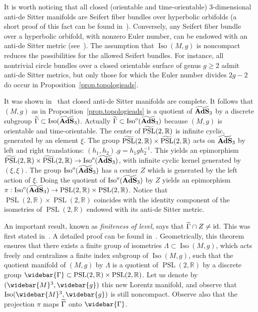 \documentclass[11pt]{article}
\theoremstyle{definition}
\numberwithin{equation}{section}
\numberwithin{figure}{section}
\numberwithin{table}{section}
\DeclareMathOperator{\Iso}{Iso}
\DeclareMathOperator{\PSL}{PSL}
\DeclareMathOperator{\id}{id}
\newcommand*\RR{\mathbb{R}}
\let\oldtilde\tilde
\renewcommand*\tilde[1]{\mathchoice{\widetilde{#1}}{\widetilde{#1}}{\widetilde{#1}}{\oldtilde{#1}}}
\let\oldbar\bar
\renewcommand*{\bar}[1]{\mathchoice{\widebar{#1}}{\widebar{#1}}{\oldbar{#1}}{\oldbar{#1}}}
\renewcommand*{\overline}{\bar}
\begin{document}
It is worth noticing that all closed (orientable and time-orientable) $3$-dimensional anti-de Sitter manifolds are Seifert fiber bundles over hyperbolic orbifolds (a short proof of this fact can be found in~\cite[Corollary~4.3.6]{tholozan}). Conversely, any Seifert fiber bundle over a hyperbolic orbifold, with nonzero Euler number, can be endowed with an anti-de Sitter metric (see~\cite{scott}). The assumption that $\Iso(M,g)$ is noncompact reduces the possibilities for the allowed Seifert bundles. For instance, all nontrivial circle bundles over a closed orientable surface of genus $g \geq 2$ admit anti-de Sitter metrics, but only those for which the Euler number divides $2g-2$ do occur in Proposition~\ref{prop.topologieads}.

It was shown in~\cite{klingler} that closed anti-de Sitter manifolds are complete. It follows that $(M,g)$ as in Proposition~\ref{prop.topologieads} is a quotient of $\tilde{\bf AdS}_3$ by a discrete subgroup $\tilde{\Gamma} \subset \Iso(\tilde{\bf AdS}_3)$. Actually $\tilde{\Gamma} \subset \Iso^o(\tilde{\bf AdS}_3)$ because $(M,g)$ is orientable and time-orientable. The center of $\tilde{\PSL}(2,\RR)$ is infinite cyclic, generated by an element $\xi$. The group $\tilde{\PSL}(2,\RR) \times
\tilde{\PSL}(2,\RR)$ acts on ${\tilde{\bf AdS}_3}$ by left and right translations: $(h_1,h_2).g=h_1gh_2^{-1}$. This yields an epimorphism $\tilde{\PSL}(2,\RR) \times
\tilde{\PSL}(2,\RR) \to \Iso^o({\tilde{\bf AdS}_3})$, with infinite cyclic kernel generated by $(\xi,\xi)$. The group $\Iso^o({\tilde{\bf AdS}_3})$ has a center $Z$ which is generated by the left action of $\xi$. Doing the quotient of $\Iso^o({\tilde{\bf AdS}_3})$ by $Z$ yields an epimorphism $\pi: \Iso^o({\tilde{\bf AdS}_3}) \to \PSL(2,\RR) \times \PSL(2,\RR)$. Notice that $\PSL(2,\RR) \times \PSL(2,\RR)$ coincides with the identity component of the isometries of $\PSL(2,\RR)$ endowed with its anti-de Sitter metric.


An important result, known as \emph{finiteness of level}, says that $\tilde{\Gamma} \cap Z \not = \id$. This was first stated in~\cite{kulkarni.raymond}. A detailed proof can be found in~\cite[Theorem~3.3.2.3]{saleinthese}. Geometrically, this theorem ensures that there exists a finite group of isometries $\Lambda \subset \Iso(M,g)$, which acts freely and centralizes a finite index subgroup of $\Iso(M,g)$, such that the quotient manifold of $(M,g)$ by $\Lambda$ is a quotient of $\PSL(2,\RR)$ by a discrete group $\overline{\Gamma} \subset \PSL(2,\RR) \times \PSL(2,\RR)$. Let us denote by $(\overline{M}^3,\overline{g})$ this new Lorentz manifold, and observe that $\Iso(\overline{M}^3,\overline{g})$ is still noncompact. Observe also that the projection $\pi$ maps $\tilde{\Gamma}$ onto $\overline{\Gamma}$.
\end{document}
